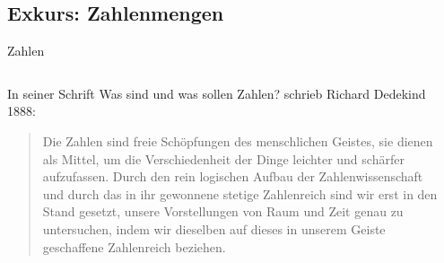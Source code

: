 \documentclass[12pt,ngerman,a4paper,ignorenonframetext,]{beamer}
\begin{document}
\hypertarget{exkurs-zahlenmengen}{%
\subsection{Exkurs: Zahlenmengen}\label{exkurs-zahlenmengen}}

\begin{frame}{Zahlen}
\protect\hypertarget{zahlen}{}


\begin{columns}[T]
	\begin{column}[t]{0.74\textwidth}

In seiner Schrift \glqq Was sind und was sollen Zahlen?\grqq\xspace 
schrieb Richard Dedekind 1888:

\vspace*{1.2em}

\begin{quote}
Die Zahlen sind freie Schöpfungen des menschlichen Geistes, sie dienen
als Mittel, um die Verschiedenheit der Dinge leichter und schärfer
aufzufassen. Durch den rein logischen Aufbau der Zahlenwissenschaft und
durch das in ihr gewonnene stetige Zahlenreich sind wir erst in den
Stand gesetzt, unsere Vorstellungen von Raum und Zeit genau zu
untersuchen, indem wir dieselben auf dieses in unserem Geiste
geschaffene Zahlenreich beziehen.
\end{quote}


	\end{column}
	\begin{column}[t]{0.24\textwidth}
	\end{column}
\end{columns}

\end{frame}
\end{document}
